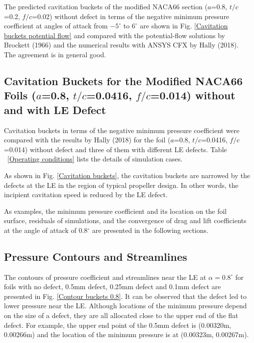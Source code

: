 \documentclass[onecolumn,11pt]{report}
\begin{document}
The predicted cavitation buckets of the modified NACA66 section ($a$=0.8, $t/c$=0.2, $f/c$=0.02) without defect in terms of the negative minimum pressure coefficient  at angles of attack from $-5^{\circ}$ to $6^{\circ}$ are shown in Fig.  \ref{Cavitation buckets potential flow} and compared with  the potential-flow solutions by Brockett (1966) and the numerical results with ANSYS CFX by Hally (2018). The agreement is in general good.




\subsection{Cavitation Buckets for the Modified NACA66 Foils ($a$=0.8, $t/c$=0.0416, $f/c$=0.014) without and with LE Defect}

Cavitation buckets in terms of the negative minimum pressure coefficient were compared with the results by Hally (2018) for the foil ($a$=0.8, $t/c$=0.0416, $f/c$=0.014) without defect and three of them with different LE defects. Table ~\ref{Operating conditions} lists the details of simulation cases. 


As shown in Fig.  \ref{Cavitation buckets}, the cavitation buckets are narrowed by the defects at the LE in the region of typical propeller design. In other words, the incipient cavitation speed is reduced by the LE defect. 


As examples, the minimum pressure coefficient and its location on the foil surface, residuals of simulations, and the convergence of drag and lift coefficients at the angle of attack of 0.8$^\circ$ are presented in the following sections.  


\subsection{Pressure Contours and Streamlines}


The contours of pressure coefficient and streamlines near the LE at $\alpha=0.8^\circ$ for foils with no defect, 0.5mm defect, 0.25mm defect and 0.1mm defect are presented in Fig.  \ref{Contour buckets 0.8}. It can be observed that the defect led to lower pressure near the LE.  Although locations of the minimum pressure depend on the size of a defect, they are all allocated close to the upper end of the flat defect. For example, the upper end point of the 0.5mm defect is (0.00320m, 0.00266m) and the location of the minimum pressure is at (0.00323m, 0.00267m). 
\end{document}
